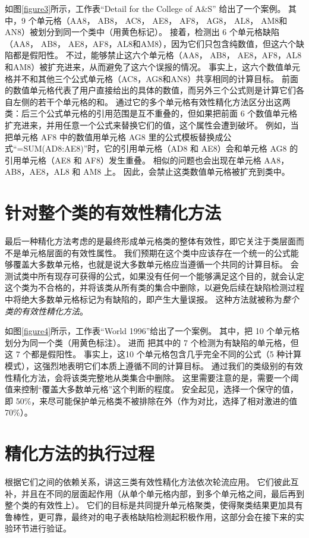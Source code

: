 如图\ref{figure3}所示，工作表“Detail for the College of A\&S” 给出了一个案例。
其中，9 个单元格（AA8， AB8， AC8， AE8， AF8， AG8， AL8， AM8和AN8）被\cu 划分到同一个类中（用黄色标记）。
接着，\cu 检测出 6 个单元格缺陷（AA8， AB8， AE8，AF8，AL8和AM8），因为它们只包含纯数值，但这六个缺陷都是假阳性。
不过，\wa 能够禁止这六个单元格（AA8， AB8， AE8，AF8，AL8和AM8）被扩充进来，从而避免了这六个误报的情况。
事实上，这六个数值单元格并不和其他三个公式单元格（AC8，AG8和AN8）共享相同的计算目标。
前面的数值单元格代表了用户直接给出的具体的数值，而另外三个公式则是计算它们各自左侧的若干个单元格的和。
\wa 通过它的多个单元格有效性精化方法区分出这两类：后三个公式单元格的引用范围是互不重叠的，但如果把前面 6 个数值单元格扩充进来，并用任意一个公式来替换它们的值，这个属性会遭到破坏。
例如，当把单元格 AF8 中的数值用单元格 AG8 里的公式模板替换成公式“=SUM(AD8:AE8)”时，它的引用单元格（AD8 和 AE8）会和单元格 AG8 的引用单元格（AE8 和 AF8）发生重叠。
相似的问题也会出现在单元格 AA8，AB8，AE8，AL8 和 AM8 上。
因此，\wa 会禁止这类数值单元格被扩充到类中。

\section{针对整个类的有效性精化方法}



最后一种精化方法考虑的是最终形成单元格类的整体有效性，即它关注于类层面而不是单元格层面的有效性属性。
我们预期在这个类中应该存在一个统一的公式能够覆盖大多数单元格，也就是说大多数单元格应当遵循一个共同的计算目标。
\wa 会测试类中所有现存可获得的公式，如果没有任何一个能够满足这个目的，\wa 就会认定这个类为不合格的，并将该类从所有类的集合中删除，以避免后续在缺陷检测过程中将绝大多数单元格标记为有缺陷的，即产生大量误报。
这种方法就被称为\textit{整个类的有效性精化方法}。

如图\ref{figure4}所示，工作表“World 1996”给出了一个案例。
其中，\cu 把 10 个单元格划分为同一个类（用黄色标注）。
进而 \cu 把其中的 7 个检测为有缺陷的单元格，但这 7 个都是假阳性。
事实上，这10 个单元格包含几乎完全不同的公式（5 种计算模式），这强烈地表明它们本质上遵循不同的计算目标。
通过我们的类级别的有效性精化方法，\wa 会将该类完整地从类集合中删除。
这里需要注意的是，\wa 需要一个阈值来控制“覆盖大多数单元格”这个判断的程度。
安全起见，\wa 选择一个保守的值，即 50\%，来尽可能保护单元格类不被排除在外（作为对比，\ca 选择了相对激进的值70\%）。

\section{精化方法的执行过程}

根据它们之间的依赖关系，\wa 讲这三类有效性精化方法依次轮流应用。
它们彼此互补，并且在不同的层面起作用（从单个单元格内部，到多个单元格之间，最后再到整个类的有效性上）。
它们的目标是共同提升单元格聚类，使得聚类结果更加具有鲁棒性，更可靠，最终对\wa 的电子表格缺陷检测起积极作用，这部分会在接下来的实验环节进行验证。